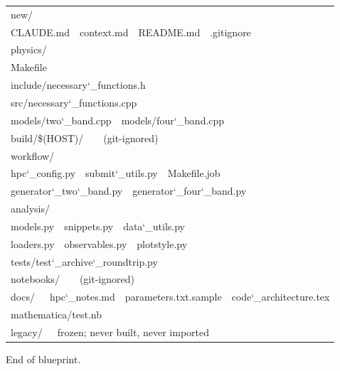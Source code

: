 \documentclass[11pt,a4paper]{article}
\newcommand{\brk}{\discretionary{}{}{}}
\newcommand{\uu}{\char`_\brk}
\begin{document}
\begin{center}\ttfamily\scriptsize
\begin{tabular}{@{}l@{}}
new/\\
\quad CLAUDE.md\ \ context.md\ \ README.md\ \ .gitignore\\
\quad physics/\\
\qquad Makefile\\
\qquad include/necessary\uu functions.h\\
\qquad src/necessary\uu functions.cpp\\
\qquad models/two\uu band.cpp\ \ models/four\uu band.cpp\\
\qquad build/\$(HOST)/\ \ \ \ \rmfamily(git-ignored)\ttfamily\\
\quad workflow/\\
\qquad hpc\uu config.py\ \ submit\uu utils.py\ \ Makefile.job\\
\qquad generator\uu two\uu band.py\ \ generator\uu four\uu band.py\\
\quad analysis/\\
\qquad models.py\ \ snippets.py\ \ data\uu utils.py\\
\qquad loaders.py\ \ observables.py\ \ plotstyle.py\\
\qquad tests/test\uu archive\uu roundtrip.py\\
\qquad notebooks/\ \ \ \ \rmfamily(git-ignored)\ttfamily\\
\quad docs/\ \ \ hpc\uu notes.md\ \ parameters.txt.sample\ \ code\uu architecture.tex\\
\quad mathematica/test.nb\\
\quad legacy/\ \ \ \rmfamily frozen; never built, never imported\ttfamily\\
\end{tabular}
\end{center}

\vfill
\begin{center}\footnotesize\sffamily\color{Slate}
End of blueprint.
\end{center}
\end{document}
